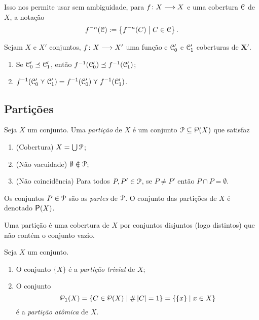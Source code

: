 Isso nos permite usar sem ambiguidade, para ${f}\colon {X} \longrightarrow {X}$ e uma cobertura $\mathcal{C}$ de $X$, a notação
	\begin{equation*}
	f^{-n}(\mathcal{C}) := \left\{{f^{-n}(C)}\;\middle\vert\;{C \in \mathcal{C}}\right\}.
	\end{equation*}

\begin{exercise}
\label{prop:cobertura.puxada.refinamento.propriedades}
Sejam $X$ e $X'$ conjuntos, ${f}\colon {X} \longrightarrow {X'}$ uma função e $\mathcal{C}'_0$ e $\mathcal{C}'_1$ coberturas de $\bm X'$.
	\begin{enumerate}
	\item Se $\mathcal{C}'_0 \preceq \mathcal{C}'_1$, então $f^{-1}(\mathcal{C}'_0) \preceq f^{-1}(\mathcal{C}'_1)$;
	\item $f^{-1}(\mathcal{C}'_0 \curlyvee \mathcal{C}'_1) = f^{-1}(\mathcal{C}'_0) \curlyvee f^{-1}(\mathcal{C}'_1)$.
	\end{enumerate}
\end{exercise}




















\subsection{Partições}

\begin{definition}[Partição]
Seja $X$ um conjunto. Uma \emph{partição} de $X$ é um conjunto $\parti \subseteq \p(X)$ que satisfaz
	\begin{enumerate}
	\item (Cobertura) $X = \bigcup \mathcal{P}$;
	\item (Não vacuidade) $\emptyset \notin \parti$;
	\item (Não coincidência) Para todos $P,P' \in \mathcal{P}$, se $P \neq P'$ então $P \cap P = \emptyset$.
	\end{enumerate}
Os conjuntos $P \in \mathcal{P}$ são as \emph{partes} de $\mathcal{P}$. O conjunto das partições de $X$ é denotado $\Parti(X)$.
\end{definition}

Uma partição é uma cobertura de $X$ por conjuntos disjuntos (logo distintos) que não contém o conjunto vazio.

\begin{example}
Seja $X$ um conjunto.
	\begin{enumerate}
	\item O conjunto $\{X\}$ é a \emph{partição trivial} de $X$;
	\item O conjunto
		\begin{equation*}
		\p_1(X) = \set{C \in \p(X)}{\card{C}=1} = \set{\{x\}}{x \in X}
		\end{equation*}
	é a \emph{partição atômica} de $X$.
	\end{enumerate}
\end{example}


